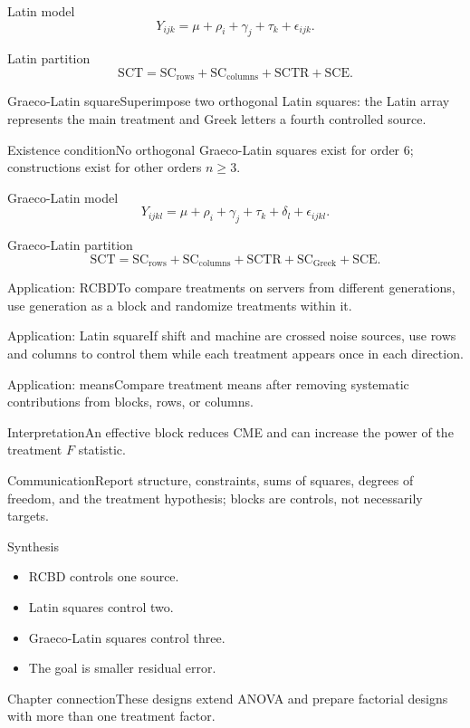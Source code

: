\documentclass[10pt,aspectratio=169]{beamer}
\begin{document}
\begin{frame}{Latin model}\small\[Y_{ijk}=\mu+\rho_i+\gamma_j+\tau_k+\epsilon_{ijk}.\]\end{frame}
\begin{frame}{Latin partition}\small\[\mathrm{SCT}=\mathrm{SC}_{\mathrm{rows}}+\mathrm{SC}_{\mathrm{columns}}+\mathrm{SCTR}+\mathrm{SCE}.\]\end{frame}
\begin{frame}{Graeco-Latin square}\small Superimpose two orthogonal Latin squares: the Latin array represents the main treatment and Greek letters a fourth controlled source.\end{frame}
\begin{frame}{Existence condition}\small No orthogonal Graeco-Latin squares exist for order $6$; constructions exist for other orders $n\geq3$.\end{frame}
\begin{frame}{Graeco-Latin model}\small\[Y_{ijkl}=\mu+\rho_i+\gamma_j+\tau_k+\delta_l+\epsilon_{ijkl}.\]\end{frame}
\begin{frame}{Graeco-Latin partition}\small\[\mathrm{SCT}=\mathrm{SC}_{\mathrm{rows}}+\mathrm{SC}_{\mathrm{columns}}+\mathrm{SCTR}+\mathrm{SC}_{\mathrm{Greek}}+\mathrm{SCE}.\]\end{frame}
\begin{frame}{Application: RCBD}\small To compare treatments on servers from different generations, use generation as a block and randomize treatments within it.\end{frame}
\begin{frame}{Application: Latin square}\small If shift and machine are crossed noise sources, use rows and columns to control them while each treatment appears once in each direction.\end{frame}
\begin{frame}{Application: means}\small Compare treatment means after removing systematic contributions from blocks, rows, or columns.\end{frame}
\begin{frame}{Interpretation}\small An effective block reduces CME and can increase the power of the treatment $F$ statistic.\end{frame}
\begin{frame}{Communication}\small Report structure, constraints, sums of squares, degrees of freedom, and the treatment hypothesis; blocks are controls, not necessarily targets.\end{frame}
\begin{frame}{Synthesis}\small\begin{itemize}\item RCBD controls one source.\item Latin squares control two.\item Graeco-Latin squares control three.\item The goal is smaller residual error.\end{itemize}\end{frame}
\begin{frame}{Chapter connection}\small These designs extend ANOVA and prepare factorial designs with more than one treatment factor.\end{frame}
\end{document}
